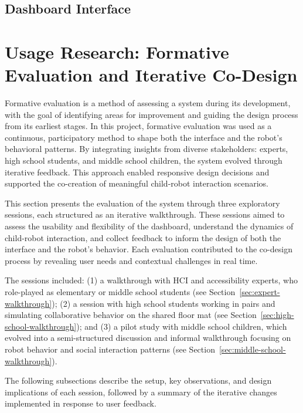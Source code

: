 \documentclass[a4paper]{usiinfbachelorproject}
\begin{document}
\subsection{\textbf{Dashboard Interface}}

\section{\textbf{Usage Research: Formative Evaluation and Iterative Co-Design}}\label{sec:evaluation}
Formative evaluation is a method of assessing a system during its development, with the goal of identifying areas for improvement and guiding the design process from its earliest stages.
In this project, formative evaluation was used as a continuous, participatory method to shape both the interface and the robot's behavioral patterns.
By integrating insights from diverse stakeholders: experts, high school students, and middle school children, the system evolved through iterative feedback.
This approach enabled responsive design decisions and supported the co-creation of meaningful child-robot interaction scenarios.

This section presents the evaluation of the system through three exploratory sessions, each structured as an iterative walkthrough.
These sessions aimed to assess the usability and flexibility of the dashboard, understand the dynamics of child-robot interaction, and collect feedback to inform the design of both the interface and the robot's behavior.
Each evaluation contributed to the co-design process by revealing user needs and contextual challenges in real time.

The sessions included:
(1) a walkthrough with HCI and accessibility experts, who role-played as elementary or middle school students (see Section~\ref{sec:expert-walkthrough});
(2) a session with high school students working in pairs and simulating collaborative behavior on the shared floor mat (see Section~\ref{sec:high-school-walkthrough}); and
(3) a pilot study with middle school children, which evolved into a semi-structured discussion and informal walkthrough focusing on robot behavior and social interaction patterns (see Section~\ref{sec:middle-school-walkthrough}).

The following subsections describe the setup, key observations, and design implications of each session, followed by a summary of the iterative changes implemented in response to user feedback.
\end{document}
